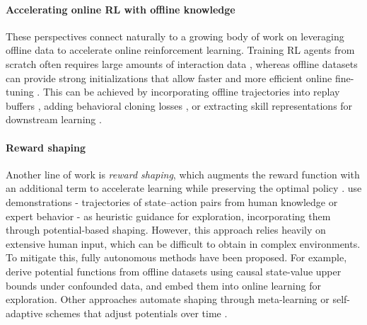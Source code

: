 \documentclass[twoside]{article}
\newcounter{notecounter}
\newcommand{\note}[2]{\refstepcounter{notecounter} \begin{leftbar}  \textcolor{red}{\textbf{#1}} \textcolor{violet}{(\textbf{Note} \thenotecounter)}: \begin{sf}{\color{blue} #2} \end{sf}  \end{leftbar}}
\newcommand{\note}[2]{}
\begin{document}
\paragraph{Accelerating online RL with offline knowledge}
These perspectives connect naturally to a growing body of work on leveraging offline data to accelerate online reinforcement learning. Training RL agents from scratch often requires large amounts of interaction data \citep{zhai2022computational,ye2020towards,kakade2002approximately}, whereas offline datasets can provide strong initializations that allow faster and more efficient online fine-tuning \citep{nakamoto2023cal, huang_augmenting_2025, pattanaik_2025}. This can be achieved by incorporating offline trajectories into replay buffers \citep{song2022hybrid,schaal1996learning, lee_2022}, adding behavioral cloning losses \citep{kang2018policy,zhu2019dexterous}, or extracting skill representations for downstream learning \citep{ajay2020opal,gupta2019relay}.

\paragraph{Reward shaping}
Another line of work is \emph{reward shaping}, which augments the reward function with an additional term to accelerate learning while preserving the optimal policy \citep{ng1999policy}. \citet{brys2015reinforcement} use demonstrations - trajectories of state–action pairs from human knowledge or expert behavior - as heuristic guidance for exploration, incorporating them through potential-based shaping. However, this approach relies heavily on extensive human input, which can be difficult to obtain in complex environments. To mitigate this, fully autonomous methods have been proposed. 
For example, \citet{li_automatic} derive potential functions from offline datasets using causal state-value upper bounds under confounded data, and embed them into online learning for exploration. Other approaches automate shaping through meta-learning \citep{zou2019reward} or self-adaptive schemes that adjust potentials over time \citep{ma2025highly}.
\end{document}
